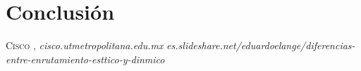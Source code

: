 \documentclass{udpreport}
\begin{document}
    
	
\chapter{Conclusión}
 
\begin{thebibliography}{x}
 \textsc{Cisco },
\textit{cisco.utmetropolitana.edu.mx}
\textit{es.slideshare.net/eduardoelange/diferencias-entre-enrutamiento-esttico-y-dinmico}

\end{thebibliography}
\end{document}
